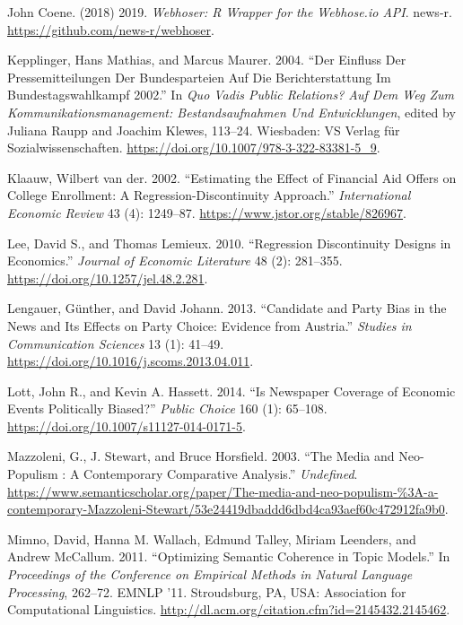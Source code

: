 \documentclass[
  12pt,
]{article}
\newlength{\cslhangindent}
\newlength{\cslentryspacingunit} %
\newenvironment{CSLReferences}[2] %
 {%
  \setlength{\parindent}{0pt}
  \ifodd #1
  \let\oldpar\par
  \def\par{\hangindent=\cslhangindent\oldpar}
  \fi
  \setlength{\parskip}{#2\cslentryspacingunit}
 }%
 {}
\begin{document}
\begin{CSLReferences}{1}{0}
\leavevmode{}%
John Coene. (2018) 2019. \emph{Webhoser: {R} Wrapper for the Webhose.io
{API}}. {news-r}. \url{https://github.com/news-r/webhoser}.

\leavevmode{}%
Kepplinger, Hans Mathias, and Marcus Maurer. 2004. {``Der {Einfluss} Der
{Pressemitteilungen} Der {Bundesparteien} Auf Die {Berichterstattung} Im
{Bundestagswahlkampf} 2002.''} In \emph{Quo Vadis {Public Relations}?
{Auf} Dem {Weg} Zum {Kommunikationsmanagement}: {Bestandsaufnahmen} Und
{Entwicklungen}}, edited by Juliana Raupp and Joachim Klewes, 113--24.
{Wiesbaden}: {VS Verlag für Sozialwissenschaften}.
\url{https://doi.org/10.1007/978-3-322-83381-5_9}.

\leavevmode{}%
Klaauw, Wilbert van der. 2002. {``Estimating the {Effect} of {Financial
Aid Offers} on {College Enrollment}: {A Regression-Discontinuity
Approach}.''} \emph{International Economic Review} 43 (4): 1249--87.
\url{https://www.jstor.org/stable/826967}.

\leavevmode{}%
Lee, David S., and Thomas Lemieux. 2010. {``Regression {Discontinuity
Designs} in {Economics}.''} \emph{Journal of Economic Literature} 48
(2): 281--355. \url{https://doi.org/10.1257/jel.48.2.281}.

\leavevmode{}%
Lengauer, Günther, and David Johann. 2013. {``Candidate and Party Bias
in the News and Its Effects on Party Choice: {Evidence} from
{Austria}.''} \emph{Studies in Communication Sciences} 13 (1): 41--49.
\url{https://doi.org/10.1016/j.scoms.2013.04.011}.

\leavevmode{}%
Lott, John R., and Kevin A. Hassett. 2014. {``Is Newspaper Coverage of
Economic Events Politically Biased?''} \emph{Public Choice} 160 (1):
65--108. \url{https://doi.org/10.1007/s11127-014-0171-5}.

\leavevmode{}%
Mazzoleni, G., J. Stewart, and Bruce Horsfield. 2003. {``The Media and
Neo-Populism : A Contemporary Comparative Analysis.''} \emph{Undefined}.
\url{https://www.semanticscholar.org/paper/The-media-and-neo-populism-\%3A-a-contemporary-Mazzoleni-Stewart/53e24419dbaddd6dbd4ca93aef60c472912fa9b0}.

\leavevmode{}%
Mimno, David, Hanna M. Wallach, Edmund Talley, Miriam Leenders, and
Andrew McCallum. 2011. {``Optimizing {Semantic Coherence} in {Topic
Models}.''} In \emph{Proceedings of the {Conference} on {Empirical
Methods} in {Natural Language Processing}}, 262--72. {EMNLP} '11.
{Stroudsburg, PA, USA}: {Association for Computational Linguistics}.
\url{http://dl.acm.org/citation.cfm?id=2145432.2145462}.


\end{CSLReferences}
\end{document}
